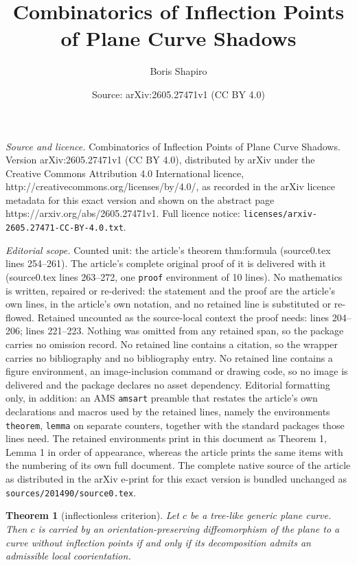 \documentclass[10pt,a4paper]{amsart}
\title{Combinatorics of Inflection Points of Plane Curve Shadows}
\author{Boris Shapiro}
\date{Source: arXiv:2605.27471v1 (CC BY 4.0)}
\newtheorem{theorem}{Theorem}
\begin{document}
\maketitle

\noindent\emph{Source and licence.} Combinatorics of Inflection Points of Plane Curve Shadows. Version arXiv:2605.27471v1 (CC BY 4.0), distributed by arXiv under the Creative Commons Attribution 4.0 International licence, http://creativecommons.org/licenses/by/4.0/, as recorded in the arXiv licence metadata for this exact version and shown on the abstract page https://arxiv.org/abs/2605.27471v1. Full licence notice: \texttt{licenses/arxiv-2605.27471-CC-BY-4.0.txt}.\par\smallskip

\noindent\textit{Editorial scope.} Counted unit: the article's theorem thm:formula (source0.tex lines 254--261). The article's complete original proof of it is delivered with it (source0.tex lines 263--272, one \texttt{proof} environment of 10 lines). No mathematics is written, repaired or re-derived: the statement and the proof are the article's own lines, in the article's own notation, and no retained line is substituted or re-flowed.  Retained uncounted as the source-local context the proof needs: lines 204--206; lines 221--223.  Nothing was omitted from any retained span, so the package carries no omission record.  No retained line contains a citation, so the wrapper carries no bibliography and no bibliography entry.  No retained line contains a figure environment, an image-inclusion command or drawing code, so no image is delivered and the package declares no asset dependency.  Editorial formatting only, in addition: an AMS \texttt{amsart} preamble that restates the article's own declarations and macros used by the retained lines, namely the environments \texttt{theorem}, \texttt{lemma} on separate counters, together with the standard packages those lines need.  The retained environments print in this document as Theorem 1, Lemma 1 in order of appearance, whereas the article prints the same items with the numbering of its own full document.  The complete native source of the article as distributed in the arXiv e-print for this exact version is bundled unchanged as \texttt{sources/201490/source0.tex}.
\begin{theorem}[inflectionless criterion]\label{thm:shapiro}
Let $c$ be a tree-like generic plane curve.  Then $c$ is carried by an orientation-preserving diffeomorphism of the plane to a curve without inflection points if and only if its decomposition admits an admissible local coorientation.
\end{theorem}
\end{document}
